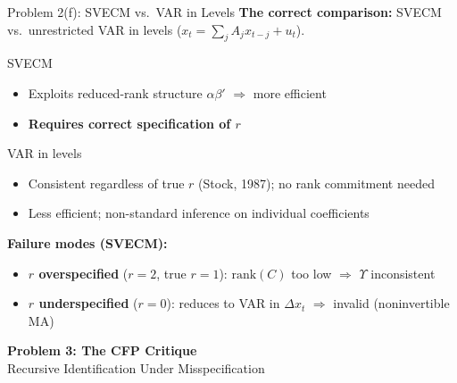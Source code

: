 \documentclass[aspectratio=169,11pt]{beamer}
\newcommand{\rank}{\mathrm{rank}}
\begin{document}
\begin{frame}{Problem 2(f): SVECM vs.\ VAR in Levels}
    \vspace{-1em}
    \textbf{The correct comparison:} SVECM vs.\ unrestricted VAR in levels ($x_t = \sum_j A_j x_{t-j} + u_t$).

    \vspace{0.3em}
    \begin{block}{SVECM}
        \begin{itemize}
            \item[\textcolor{darkblue}{+}] Exploits reduced-rank structure $\alpha\beta'$ $\Rightarrow$ more efficient
            \item[\textcolor{mitred}{--}] \textbf{Requires correct specification of $r$}
        \end{itemize}
    \end{block}

    \begin{block}{VAR in levels}
        \begin{itemize}
            \item[\textcolor{darkblue}{+}] Consistent regardless of true $r$ (Stock, 1987); no rank commitment needed
            \item[\textcolor{mitred}{--}] Less efficient; non-standard inference on individual coefficients
        \end{itemize}
    \end{block}

    \vspace{0.3em}
    \textbf{Failure modes (SVECM):}
    \begin{itemize}
        \item \textbf{$r$ overspecified} ($r=2$, true $r=1$): $\rank(C)$ too low $\Rightarrow$ $\Upsilon$ inconsistent
        \item \textbf{$r$ underspecified} ($r=0$): reduces to VAR in $\Delta x_t$ $\Rightarrow$ invalid (noninvertible MA)
    \end{itemize}
\end{frame}

\begin{frame}[plain]
    \begin{center}
        {\Large \textbf{Problem 3: The CFP Critique}}\\[1em]
        {\large Recursive Identification Under Misspecification}
    \end{center}
\end{frame}
\end{document}
